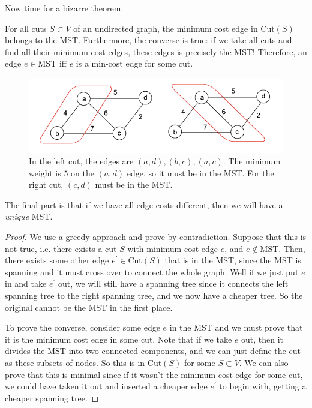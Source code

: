 \documentclass{article}
\begin{document}
      Now time for a bizarre theorem. 

      \begin{theorem}
        For all cuts $S \subset V$ of an undirected graph, the minimum cost edge in $\mathrm{Cut}(S)$ belongs to the MST. Furthermore, the converse is true: if we take all cuts and find all their minimum cost edges, these edges is precisely the MST! Therefore, an edge $e \in \mathrm{MST}$ iff $e$ is a min-cost edge for some cut. 
        \begin{figure}[H]
          \centering 
          \includegraphics[scale=0.4]{img/mst_cut_prop.png}
          \caption{In the left cut, the edges are $(a,d), (b, c), (a, c)$. The minimum weight is $5$ on the $(a, d)$ edge, so it must be in the MST. For the right cut, $(c, d)$ must be in the MST. } 
          \label{fig:mst_cut_prop}
        \end{figure}
        The final part is that if we have all edge costs different, then we will have a \textit{unique} MST. 
      \end{theorem}
      \begin{proof}
        We use a greedy approach and prove by contradiction. Suppose that this is not true, i.e. there exists a cut $S$ with minimum cost edge $e$, and $e \not\in \mathrm{MST}$. Then, there exists some other edge $e^\prime \in \mathrm{Cut}(S)$ that is in the MST, since the MST is spanning and it must cross over to connect the whole graph. Well if we just put $e$ in and take $e^\prime$ out, we will still have a spanning tree since it connects the left spanning tree to the right spanning tree, and we now have a cheaper tree. So the original cannot be the MST in the first place. 

        To prove the converse, consider some edge $e$ in the MST and we must prove that it is the minimum cost edge in some cut. Note that if we take $e$ out, then it divides the MST into two connected components, and we can just define the cut as these subsets of nodes. So this is in $\mathrm{Cut}(S)$ for some $S \subset V$. We can also prove that this is minimal since if it wasn't the minimum cost edge for some cut, we could have taken it out and inserted a cheaper edge $e^\prime$ to begin with, getting a cheaper spanning tree.   
      \end{proof}
\end{document}
